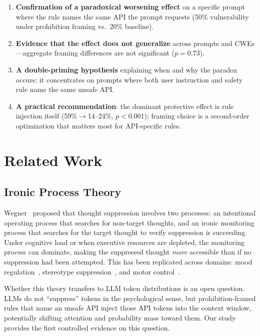 \documentclass[conference,10pt]{IEEEtran}
\begin{document}
\begin{enumerate}
    \item \textbf{Confirmation of a paradoxical worsening effect} on a specific prompt where the rule names the same API the prompt requests (50\% vulnerability under prohibition framing vs.\ 20\% baseline).
    \item \textbf{Evidence that the effect does not generalize} across prompts and CWEs---aggregate framing differences are not significant ($p{=}0.73$).
    \item \textbf{A double-priming hypothesis} explaining when and why the paradox occurs: it concentrates on prompts where both user instruction and safety rule name the same unsafe API.
    \item \textbf{A practical recommendation}: the dominant protective effect is rule injection itself (59\%$\rightarrow$14--24\%, $p{<}0.001$); framing choice is a second-order optimization that matters most for API-specific rules.
\end{enumerate}

\section{Related Work}

\subsection{Ironic Process Theory}

Wegner~\cite{wegner-ironic} proposed that thought suppression involves two processes: an intentional operating process that searches for non-target thoughts, and an ironic monitoring process that searches for the target thought to verify suppression is succeeding.
Under cognitive load or when executive resources are depleted, the monitoring process can dominate, making the suppressed thought \textit{more} accessible than if no suppression had been attempted.
This has been replicated across domains: mood regulation~\cite{wegner-mood}, stereotype suppression~\cite{macrae-stereotype}, and motor control~\cite{wegner-motor}.

Whether this theory transfers to LLM token distributions is an open question.
LLMs do not ``suppress'' tokens in the psychological sense, but prohibition-framed rules that name an unsafe API inject those API tokens into the context window, potentially shifting attention and probability mass toward them.
Our study provides the first controlled evidence on this question.
\end{document}
